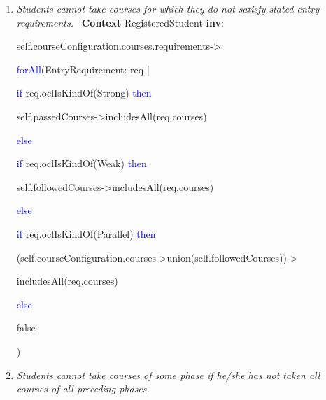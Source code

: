 \begin{enumerate}
	\item \emph{Students cannot take courses for which they do not satisfy stated
	entry requirements.} \
	\npar \textbf{Context} RegisteredStudent \textbf{inv}:
	\par \hspace*{5 mm} self.courseConfiguration.courses.requirements->
	\par \hspace*{10 mm} \textcolor{Blue}{forAll}(EntryRequirement: req |
	\par \hspace*{15 mm} \textcolor{Blue}{if} req.oclIsKindOf(Strong)
	\textcolor{Blue}{then} \par \hspace*{20 mm}
	self.passedCourses->includesAll(req.courses) 
	\par \hspace*{15 mm} \textcolor{Blue}{else}
	\par \hspace*{20 mm} \textcolor{Blue}{if} req.oclIsKindOf(Weak)
	\textcolor{Blue}{then}
	\par \hspace*{25 mm}
	self.followedCourses->includesAll(req.courses) 
	\par \hspace*{20 mm} \textcolor{Blue}{else}
	\par \hspace*{25 mm} \textcolor{Blue}{if} req.oclIsKindOf(Parallel)
	\textcolor{Blue}{then}
	\par \hspace*{30 mm}
	(self.courseConfiguration.courses->union(self.followedCourses))->
	\par \hspace*{32 mm}includesAll(req.courses)
	\par \hspace*{25 mm} \textcolor{Blue}{else}
	\par \hspace*{30 mm} false
	\par \hspace*{5 mm} )

	\item \emph{Students cannot take courses of some phase if he/she has not taken
	all courses of all preceding phases.}
	

\end{enumerate}
